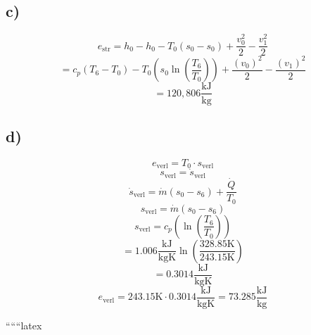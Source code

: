 \subsection*{c)}
\[
e_{\text{str}} = h_0 - h_0 - T_0 (s_0 - s_0) + \frac{v_0^2}{2} - \frac{v_1^2}{2}
\]
\[
= c_p (T_6 - T_0) - T_0 \left( s_0 \ln \left( \frac{T_6}{T_0} \right) \right) + \frac{(v_0)^2}{2} - \frac{(v_1)^2}{2}
\]
\[
= 120,806 \frac{\text{kJ}}{\text{kg}}
\]

\subsection*{d)}
\[
e_{\text{verl}} = T_0 \cdot s_{\text{verl}}
\]
\[
s_{\text{verl}} = \dot{s}_{\text{verl}}
\]
\[
\dot{s}_{\text{verl}} = \dot{m} (s_0 - s_6) + \frac{\dot{Q}}{T_0}
\]
\[
s_{\text{verl}} = \dot{m} (s_0 - s_6)
\]
\[
s_{\text{verl}} = c_p \left( \ln \left( \frac{T_6}{T_0} \right) \right)
\]
\[
= 1.006 \frac{\text{kJ}}{\text{kgK}} \ln \left( \frac{328.85 \text{K}}{243.15 \text{K}} \right)
\]
\[
= 0.3014 \frac{\text{kJ}}{\text{kgK}}
\]
\[
e_{\text{verl}} = 243.15 \text{K} \cdot 0.3014 \frac{\text{kJ}}{\text{kgK}} = 73.285 \frac{\text{kJ}}{\text{kg}}
\]

``````latex


